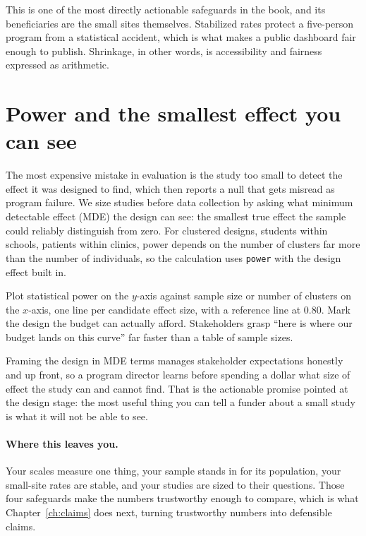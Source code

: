 \documentclass[
    a4paper,
    fontsize=10pt,
    twoside=true,
    numbers=noenddot,
]{kaobook}
\newenvironment{vizcallout}[1][Visualization to build]{%
    \begin{vizbox}[frametitle={#1}]%
}{%
    \end{vizbox}%
}
\begin{document}
This is one of the most directly actionable safeguards in the book, and its beneficiaries are the small sites themselves. Stabilized rates protect a five-person program from a statistical accident, which is what makes a public dashboard fair enough to publish. Shrinkage, in other words, is accessibility and fairness expressed as arithmetic.

\section{Power and the smallest effect you can see}\label{sec:mde}
The most expensive mistake in evaluation is the study too small to detect the effect it was designed to find, which then reports a null that gets misread as program failure. We size studies before data collection by asking what minimum detectable effect (MDE) the design can see: the smallest true effect the sample could reliably distinguish from zero. For clustered designs, students within schools, patients within clinics, power depends on the number of clusters far more than the number of individuals, so the calculation uses \texttt{power} with the design effect built in.

\begin{vizcallout}[Visualization to build: the power curve]
Plot statistical power on the $y$-axis against sample size or number of clusters on the $x$-axis, one line per candidate effect size, with a reference line at 0.80. Mark the design the budget can actually afford. Stakeholders grasp \enquote{here is where our budget lands on this curve} far faster than a table of sample sizes.
\end{vizcallout}

Framing the design in MDE terms manages stakeholder expectations honestly and up front, so a program director learns before spending a dollar what size of effect the study can and cannot find. That is the actionable promise pointed at the design stage: the most useful thing you can tell a funder about a small study is what it will not be able to see.

\paragraph{Where this leaves you.} Your scales measure one thing, your sample stands in for its population, your small-site rates are stable, and your studies are sized to their questions. Those four safeguards make the numbers trustworthy enough to compare, which is what Chapter~\ref{ch:claims} does next, turning trustworthy numbers into defensible claims.
\end{document}
